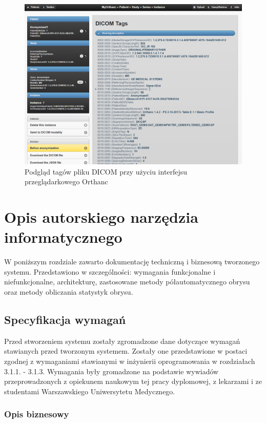\documentclass[a4paper,11pt,twoside,openright]{report}
\newcommand\blankpage{%
    \null
    \thispagestyle{empty}%
    \newpage}
\theoremstyle{definition}
\begin{document}
\begin{figure}[t]
	\center
	\includegraphics[width=1\textwidth]{Orthanc-tags}
	\caption{Podgląd tagów pliku DICOM przy użyciu interfejsu przeglądarkowego Orthanc}
    	\label{fig:Orthanc-tags}
\end{figure}

\afterpage{\blankpage}

\chapter {Opis autorskiego narzędzia informatycznego}

W poniższym rozdziale zawarto dokumentację techniczną i biznesową tworzonego systemu.
 Przedstawiono w szczególności: wymagania funkcjonalne i niefunkcjonalne,
 architekturę, zastosowane metody półautomatycznego obrysu oraz metody obliczania
 statystyk obrysu.

\section {Specyfikacja wymagań}

Przed stworzeniem systemu zostały zgromadzone dane dotyczące wymagań stawianych
przed tworzonym systemem. Zostały one przedstawione w postaci zgodnej z wymaganiami
stawianymi w inżynierii oprogramowania w rozdziałach 3.1.1. - 3.1.3. Wymagania
były gromadzone na podstawie wywiadów przeprowadzonych z opiekunem naukowym tej
pracy dyplomowej, z lekarzami i ze studentami Warszawskiego Uniwersytetu Medycznego.

\subsection {Opis biznesowy}
\end{document}
